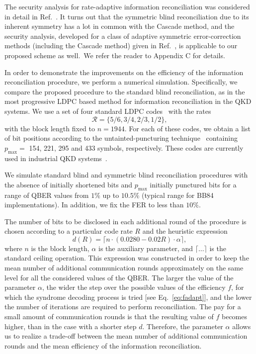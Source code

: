 \documentclass[aps,pra,twocolumn,amsmath,amssymb,nofootinbib,showpacs,superscriptaddress]{revtex4-1}
\begin{document}
The security analysis for rate-adaptive information reconciliation was considered in detail in Ref.~\cite{LDPC_security}.
It turns out that the symmetric blind reconciliation due to its inherent symmetry has a lot in common with the Cascade method, and the security analysis, 
developed for a class of adaptive symmetric error-correction methods (including the Cascade method) given in Ref.~\cite{LO_decoupling}, is applicable to our proposed scheme as well.~We refer the reader to Appendix C for details.

In order to demonstrate the improvements on the efficiency of the information reconciliation procedure, we perform a numerical simulation. 
Specifically, we compare the proposed procedure to the standard blind reconciliation, as in the most progressive LDPC based method for information reconciliation in the QKD systems.
We use a set of four standard LDPC codes~\cite{Standard} with the rates 
\begin{equation}\label{eq:codeset}
	\mathcal{R} = \{5/6, 3/4, 2/3, 1/2\},
\end{equation} 
with the block length fixed to $n=1944$.
For each of these codes, we obtain a list of bit positions according to the untainted-puncturing technique~\cite{UntP} containing $p_{\max}=$ 154, 221, 295 and 433 symbols, respectively.
These codes are currently used in industrial QKD systems~\cite{Gisin2,Fedorov}.

We simulate standard blind and symmetric blind reconciliation procedures with the absence of initially shortened bits and $p_{\max}$ 
initially punctured bits for a range of QBER values from $1\%$ up to $10.5\%$ (typical range for BB84 implementations).
In addition, we fix the FER to less than $10\%$.

The number of bits to be disclosed in each additional round of the procedure is chosen according to a particular code rate $R$ and the heuristic expression
\begin{equation}\label{eq:d}
	d(R) = \lceil n\cdot(0.0280-0.02R) \cdot \alpha \rceil ,
\end{equation}
where $n$ is the block length, $\alpha$ is the auxiliary parameter, and $\lceil\dots\rceil$ is the standard ceiling operation.
This expression was constructed in order to keep the mean number of additional communication rounds approximately on the same level for all the considered values of the QBER.
The larger the value of the parameter $\alpha$, the wider the step over the possible values of the efficiency $f$, 
for which the syndrome decoding process is tried [see Eq.~\eqref{eq:fadapt}], and the lower the number of iterations are required to perform reconciliation.
The pay for a small amount of communication rounds is that the resulting value of $f$ becomes higher, than in the case with a shorter step $d$.
Therefore, the parameter $\alpha$ allows us to realize a trade-off between the mean number of additional communication rounds and the mean efficiency of the information reconciliation.
\end{document}
